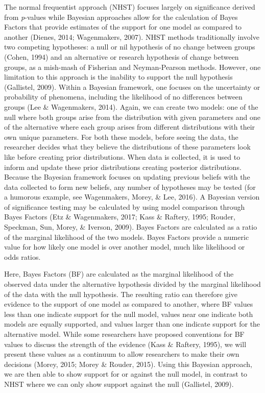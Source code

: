 \documentclass[english,man]{apa6}
\theoremstyle{definition}
\theoremstyle{definition}
\theoremstyle{definition}
\theoremstyle{remark}
\begin{document}
The normal frequentist approach (NHST) focuses largely on significance
derived from \emph{p}-values while Bayesian approaches allow for the
calculation of Bayes Factors that provide estimates of the support for
one model as compared to another (Dienes, 2014; Wagenmakers, 2007). NHST
methods traditionally involve two competing hypotheses: a null or nil
hypothesis of no change between groups (Cohen, 1994) and an alternative
or research hypothesis of change between groups, as a mish-mash of
Fisherian and Neyman-Pearson methods. However, one limitation to this
approach is the inability to support the null hypothesis (Gallistel,
2009). Within a Bayesian framework, one focuses on the uncertainty or
probability of phenomena, including the likelihood of no differences
between groups (Lee \& Wagenmakers, 2014). Again, we can create two
models: one of the null where both groups arise from the distribution
with given parameters and one of the alternative where each group arises
from different distributions with their own unique parameters. For both
these models, before seeing the data, the researcher decides what they
believe the distributions of these parameters look like before creating
prior distributions. When data is collected, it is used to inform and
update these prior distributions creating posterior distributions.
Because the Bayesian framework focuses on updating previous beliefs with
the data collected to form new beliefs, any number of hypotheses may be
tested (for a humorous example, see Wagenmakers, Morey, \& Lee, 2016). A
Bayesian version of significance testing may be calculated by using
model comparison through Bayes Factors (Etz \& Wagenmakers, 2017; Kass
\& Raftery, 1995; Rouder, Speckman, Sun, Morey, \& Iverson, 2009). Bayes
Factors are calculated as a ratio of the marginal likelihood of the two
models. Bayes Factors provide a numeric value for how likely one model
is over another model, much like likelihood or odds ratios.

Here, Bayes Factors (BF) are calculated as the marginal likelihood of
the observed data under the alternative hypothesis divided by the
marginal likelihood of the data with the null hypothesis. The resulting
ratio can therefore give evidence to the support of one model as
compared to another, where BF values less than one indicate support for
the null model, values near one indicate both models are equally
supported, and values larger than one indicate support for the
alternative model. While some researchers have proposed conventions for
BF values to discuss the strength of the evidence (Kass \& Raftery,
1995), we will present these values as a continuum to allow researchers
to make their own decisions (Morey, 2015; Morey \& Rouder, 2015). Using
this Bayesian approach, we are then able to show support for or against
the null model, in contrast to NHST where we can only show support
against the null (Gallistel, 2009).
\end{document}
